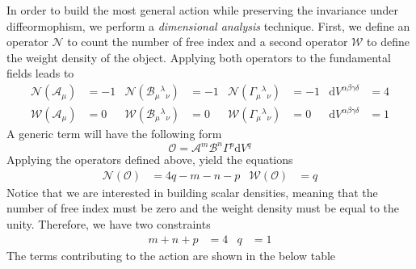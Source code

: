 \documentclass[10pt,a4paper]{article}
\begin{document}
In order to build the most general action while preserving the invariance under diffeormophism, we perform a \textit{dimensional analysis} technique. First,
we define an operator $\mathcal{N}$ to count the number of free index  and a second operator $\mathcal{W}$ to define the weight density of the object. Applying both
operators to the fundamental fields leads to
\begin{align}
  \mathcal{N}(\mathcal{A}_\mu)& = -1 & \mathcal{N}(\mathcal{B}_{\mu}{}^{\lambda}{}_{\nu})& = -1 & \mathcal{N}(\Gamma_{\mu}{}^{\lambda}{}_{\nu})& = -1 & \mathrm{d}V^{\alpha\beta\gamma\delta}& = 4 \\
  \mathcal{W}(\mathcal{A}_\mu)& = 0 & \mathcal{W}(\mathcal{B}_{\mu}{}^{\lambda}{}_{\nu})& = 0 & \mathcal{W}(\Gamma_{\mu}{}^{\lambda}{}_{\nu})& = 0 & \mathrm{d}V^{\alpha\beta\gamma\delta}& = 1 
\end{align}
A generic term will have the following form
\begin{equation}
  \mathcal{O} = \mathcal{A}^m\mathcal{B}^n\Gamma^p\mathrm{d}V^q
\end{equation}
Applying the operators defined above, yield the equations
\begin{align}
  \mathcal{N}(\mathcal{O}) & = 4q - m - n - p & \mathcal{W}(\mathcal{O}) & = q 
\end{align}
Notice that we are interested in building scalar densities, meaning that the number of free index must be zero and the weight density must be equal to the unity. Therefore,
we have two constraints
\begin{align}
  m + n + p & = 4 & q & = 1
\end{align}
The terms contributing to the action are shown in the below table
\end{document}
